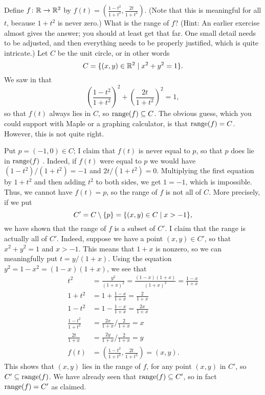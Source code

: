 \documentclass[a4paper]{book}
\theoremstyle{definition}
\newenvironment{sstarex}{
 \renewcommand{\thetheorem}{\arabic{chapter}.\arabic{section}.\arabic{theorem}${}^{**}$}
 \exercise
}{\endexercise}
\renewenvironment{solution}{\SolutionInline}{\endSolutionInline}
\begin{document}
\begin{sstarex}
 Define $f\colon{\mathbb{R}}\xrightarrow{}{\mathbb{R}}^2$ by
 $f(t)=(\frac{1-t^2}{1+t^2},\frac{2t}{1+t^2})$.  (Note that this is
 meaningful for all $t$, because $1+t^2$ is never zero.)  What is the
 range of $f$?  (Hint: An earlier exercise almost gives the answer;
 you should at least get that far.  One small detail needs to be
 adjusted, and then everything needs to be properly justified, which
 is quite intricate.)
\end{sstarex}
\begin{solution}
 Let $C$ be the unit circle, or in other words
 \[ C = \{(x,y)\in{\mathbb{R}}^2 \;|\; x^2+y^2 = 1\}. \]
 We saw in  that
 \[ \left(\frac{1-t^2}{1+t^2}\right)^2 +
    \left(\frac{2t}{1+t^2}\right)^2 = 1,
 \]
 so that $f(t)$ always lies in $C$, so $\operatorname{range}(f)\subseteq C$.  The obvious
 guess, which you could support with Maple or a graphing calculator,
 is that $\operatorname{range}(f)=C$.  However, this is not quite right.
 
 Put $p=(-1,0)\in C$; I claim that $f(t)$ is never equal to $p$, so
 that $p$ does  lie in $\operatorname{range}(f)$ .  Indeed, if $f(t)$ were
 equal to $p$ we would have $(1-t^2)/(1+t^2)=-1$ and $2t/(1+t^2)=0$.
 Multiplying the first equation by $1+t^2$ and then adding $t^2$ to
 both sides, we get $1=-1$, which is impossible.  Thus, we cannot have
 $f(t)=p$, so the range of $f$ is not all of $C$.  More precisely, if
 we put
 \[ C'=C\setminus\{p\} = \{(x,y)\in C \;|\; x>-1\}, \]
 we have shown that the range of $f$ is a subset of $C'$.  I claim
 that the range is actually all of $C'$.  Indeed, suppose we have a
 point $(x,y)\in C'$, so that $x^2+y^2=1$ and $x>-1$.  This means that
 $1+x$ is nonzero, so we can meaningfully put $t=y/(1+x)$.  Using the
 equation $y^2=1-x^2=(1-x)(1+x)$, we see that
 \begin{align*}
  t^2 &= \frac{y^2}{(1+x)^2} = \frac{(1-x)(1+x)}{(1+x)^2}
          = \frac{1-x}{1+x} \\
  1+t^2 &= 1 + \frac{1-x}{1+x} = \frac{2}{1+x} \\
  1-t^2 &= 1 - \frac{1-x}{1+x} = \frac{2x}{1+x} \\
  \frac{1-t^2}{1+t^2} &= \frac{2x}{1+x}/\frac{2}{1+x} = x \\
  \frac{2t}{1+x}      &= \frac{2y}{1+x}/\frac{2}{1+x} = y \\
  f(t) &= \left(\frac{1-t^2}{1+t^2},\frac{2t}{1+t^2}\right)
          = (x,y).
 \end{align*}
 This shows that $(x,y)$ lies in the range of $f$, for any point
 $(x,y)$ in $C'$, so $C'\subseteq\operatorname{range}(f)$.  We have already seen that
 $\operatorname{range}(f)\subseteq C'$, so in fact $\operatorname{range}(f)=C'$ as claimed.
\end{solution}
\end{document}
